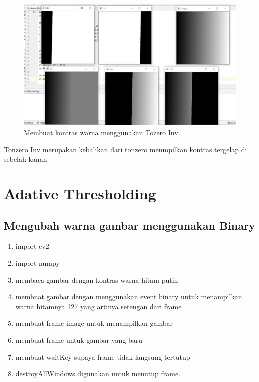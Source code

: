 \newpage
\begin{figure}[ht]
\centering
\includegraphics[scale=0.5]{figures/2,42.jpg}
\caption{Membuat kontras warna menggunakan Tozero Inv}
\label{contoh}
\end{figure}
Tonzero Inv merupakan kebalikan dari tonzero menmpilkan kontras tergelap di sebelah kanan




\newpage
\section{Adative Thresholding}
\subsection{Mengubah warna gambar menggunakan Binary}

\begin{enumerate}
	\item import cv2
	\item import numpy
	\item membaca gambar dengan kontras warna hitam putih
	\item membuat gambar dengan menggunakan event binary untuk menampilkan warna hitamnya 127 yang artinya setengan dari frame
	\item membuat frame image untuk menampilkan gambar
	\item membuat frame untuk gambar yang baru
	\item membuat waitKey supaya frame tidak langsung tertutup
	\item destroyAllWindows digunakan untuk menutup frame.
\end{enumerate}

